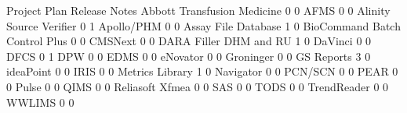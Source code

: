 \documentclass{article}
\begin{document}
\begin{Schunk}
\begin{Soutput}
                                Project Plan Release Notes
  Abbott Transfusion Medicine              0             0
  AFMS                                     0             0
  Alinity Source Verifier                  0             1
  Apollo/PHM                               0             0
  Assay File Database                      1             0
  BioCommand Batch Control Plus            0             0
  CMSNext                                  0             0
  DARA Filler DHM and RU                   1             0
  DaVinci                                  0             0
  DFCS                                     0             1
  DPW                                      0             0
  EDMS                                     0             0
  eNovator                                 0             0
  Groninger                                0             0
  GS Reports                               3             0
  ideaPoint                                0             0
  IRIS                                     0             0
  Metrics Library                          1             0
  Navigator                                0             0
  PCN/SCN                                  0             0
  PEAR                                     0             0
  Pulse                                    0             0
  QIMS                                     0             0
  Reliasoft Xfmea                          0             0
  SAS                                      0             0
  TODS                                     0             0
  TrendReader                              0             0
  WWLIMS                                   0             0
                               

\end{Soutput}
\end{Schunk}
\end{document}
